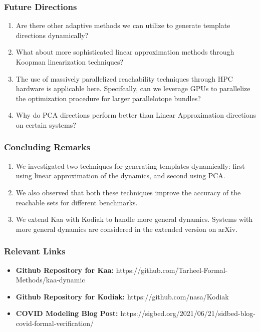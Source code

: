 \documentclass{beamer}
\begin{document}
\begin{frame}
  \frametitle{Future Directions}
  \begin{enumerate}
    \item Are there other adaptive methods we can utilize to generate template directions dynamically?
    \item What about more sophisticated linear approximation methods through Koopman linearization techniques?
    \item The use of massively parallelized reachability techniques through HPC hardware is applicable here. Specifcally, can we leverage GPUs to parallelize the optimization procedure for larger parallelotope bundles?
    \item Why do PCA directions perform better than Linear Approximation directions on certain systems?
  \end{enumerate}
\end{frame}

\begin{frame}
  \frametitle{Concluding Remarks}
  \begin{enumerate}
    \item We investigated two techniques for generating templates dynamically: first using linear approximation of the dynamics, and second using PCA.
    \item We also observed that both these techniques improve the accuracy of the reachable sets for different benchmarks.
    \item We extend Kaa with Kodiak to handle more general dynamics. Systems with more general dynamics are considered in the extended version on arXiv.
  \end{enumerate}
\end{frame}

\begin{frame}
    \frametitle{Relevant Links}
    \begin{itemize}
      \item \textbf{Github Repository for Kaa:} \newline
        https://github.com/Tarheel-Formal-Methods/kaa-dynamic
      \item \textbf{Github Repository for Kodiak:} \newline
        https://github.com/nasa/Kodiak
      \item \textbf{COVID Modeling Blog Post:} \newline
      https://sigbed.org/2021/06/21/sidbed-blog-covid-formal-verification/
    \end{itemize}
\end{frame}
\end{document}
